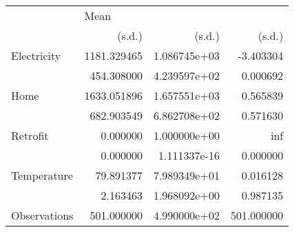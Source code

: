 \begin{tabular}{lrrr}
\toprule
{} & \multicolumn{3}{l}{Mean} \\
{} &       (s.d.) &        (s.d.) &      (s.d.) \\
\midrule
Electricity  &  1181.329465 &  1.086745e+03 &   -3.403304 \\
             &   454.308000 &  4.239597e+02 &    0.000692 \\
Home         &  1633.051896 &  1.657551e+03 &    0.565839 \\
             &   682.903549 &  6.862708e+02 &    0.571630 \\
Retrofit     &     0.000000 &  1.000000e+00 &         inf \\
             &     0.000000 &  1.111337e-16 &    0.000000 \\
Temperature  &    79.891377 &  7.989349e+01 &    0.016128 \\
             &     2.163463 &  1.968092e+00 &    0.987135 \\
Observations &   501.000000 &  4.990000e+02 &  501.000000 \\
\bottomrule
\end{tabular}
